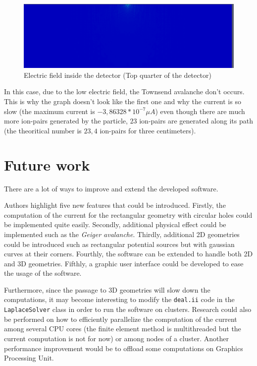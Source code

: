 \documentclass[11pt]{article}
\begin{document}
				\begin{figure}[H]
				  \center
				  \includegraphics[scale=0.4]{images/applications/electric_field.png}
				  \caption{Electric field inside the detector (Top quarter of the detector)}
				  \label{fig:electric_field}
				\end{figure}

				In this case, due to the low electric field, the Townsend avalanche don't occurs. This is why the graph doesn't
				look like the first one and why the current is so slow (the maximum current is $-3,86328*10^{-7}\mu A$) even though
				there are much more ion-pairs generated by the particle, $23$ ion-pairs are generated along its path (the theoritical
				number is $23,4$ ion-pairs for three centimeters).

\section{Future work}

	There are a lot of ways to improve and extend the developed software.

	Authors highlight five new features that could be introduced. Firstly, the
	computation of the current for the
	rectangular geometry with circular holes could be implemented quite easily.
	Secondly, additional physical effect
	could be implemented such as the \textit{Geiger avalanche}. Thirdly,
	additional 2D geometries could be introduced such as
	rectangular potential sources but with gaussian curves at their corners.
	Fourthly, the software can be extended to handle both 2D and 3D geometries.
	Fifthly, a graphic user interface could be developed to ease the usage of the
	software.

	Furthermore, since the passage to 3D geometries will slow down the computations,
	it may become interesting to modify the \texttt{deal.ii} code in the
	\texttt{LaplaceSolver} class in order to run the software on clusters.
	Research could also be performed on how to efficiently parallelize the
	computation of the current among several CPU cores (the finite element method
	is multithreaded but the current computation is not for now) or among nodes of a cluster.
	Another performance improvement would be to offload some computations on
	Graphics Processing Unit.
\end{document}
